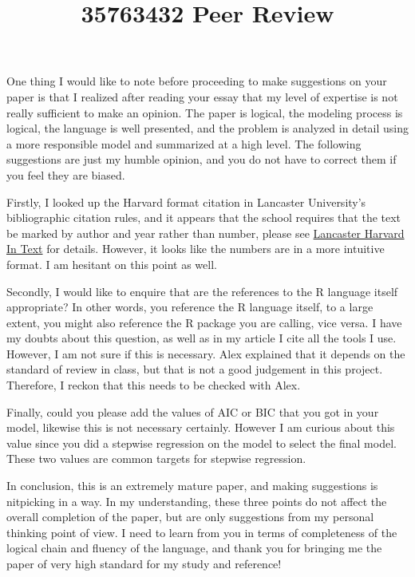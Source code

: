 \documentclass[a4paper,11pt]{article}
\title{35763432 Peer Review}
\begin{document}
\maketitle

One thing I would like to note before proceeding to make suggestions on your paper is that I realized after reading your essay that my level of expertise is not really sufficient to make an opinion. The paper is logical, the modeling process is logical, the language is well presented, and the problem is analyzed in detail using a more responsible model and summarized at a high level. The following suggestions are just my humble opinion, and you do not have to correct them if you feel they are biased.

Firstly, I looked up the Harvard format citation in Lancaster University's bibliographic citation rules, and it appears that the school requires that the text be marked by author and year rather than number, please see \href{https://lancaster.libguides.com/harvard/in-text}{Lancaster Harvard In Text} for details. However, it looks like the numbers are in a more intuitive format. I am hesitant on this point as well.

Secondly, I would like to enquire that are the references to the R language itself appropriate? In other words, you reference the R language itself, to a large extent, you might also reference the R package you are calling, vice versa. I have my doubts about this question, as well as in my article I cite all the tools I use. However, I am not sure if this is necessary. Alex explained that it depends on the standard of review in class, but that is not a good judgement in this project. Therefore, I reckon that this needs to be checked with Alex.


Finally, could you please add the values of AIC or BIC that you got in your model, likewise this is not necessary certainly. However I am curious about this value since you did a stepwise regression on the model to select the final model. These two values are common targets for stepwise regression.

In conclusion, this is an extremely mature paper, and making suggestions is nitpicking in a way. In my understanding, these three points do not affect the overall completion of the paper, but are only suggestions from my personal thinking point of view. I need to learn from you in terms of completeness of the logical chain and fluency of the language, and thank you for bringing me the paper of very high standard for my study and reference!
\end{document}
